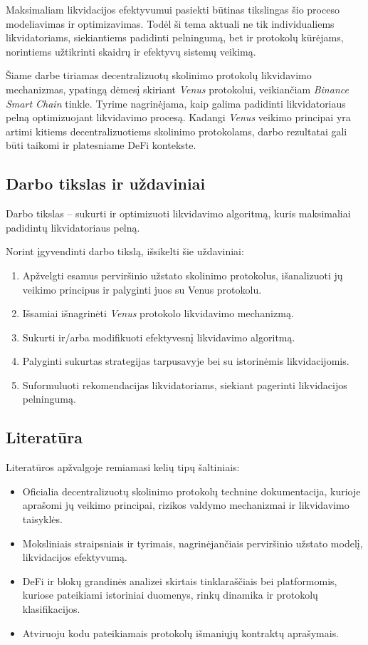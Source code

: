 \documentclass[]{VUMIFTemplateClass}
\begin{document}
Maksimaliam likvidacijos efektyvumui pasiekti būtinas tikslingas šio proceso modeliavimas ir optimizavimas. Todėl ši tema aktuali ne tik individualiems likvidatoriams, siekiantiems padidinti pelningumą, bet ir protokolų kūrėjams, norintiems užtikrinti skaidrų ir efektyvų sistemų veikimą.

Šiame darbe tiriamas decentralizuotų skolinimo protokolų likvidavimo mechanizmas, ypatingą dėmesį skiriant \textit{Venus} protokolui, veikiančiam \textit{Binance Smart Chain} tinkle. Tyrime nagrinėjama, kaip galima padidinti likvidatoriaus pelną optimizuojant likvidavimo procesą. Kadangi \textit{Venus} veikimo principai yra artimi kitiems decentralizuotiems skolinimo protokolams, darbo rezultatai gali būti taikomi ir platesniame DeFi kontekste.

\subsection*{Darbo tikslas ir uždaviniai}
Darbo tikslas – sukurti ir optimizuoti likvidavimo algoritmą, kuris maksimaliai padidintų likvidatoriaus pelną.

Norint įgyvendinti darbo tikslą, išsikelti šie uždaviniai:
\begin{enumerate}
    \item Apžvelgti esamus perviršinio užstato skolinimo protokolus, išanalizuoti jų veikimo principus ir palyginti juos su Venus protokolu.
    \item Išsamiai išnagrinėti \textit{Venus} protokolo likvidavimo mechanizmą.
    \item Sukurti ir/arba modifikuoti efektyvesnį likvidavimo algoritmą.
    \item Palyginti sukurtas strategijas tarpusavyje bei su istorinėmis likvidacijomis.
    \item Suformuluoti rekomendacijas likvidatoriams, siekiant pagerinti likvidacijos pelningumą.
\end{enumerate}

\subsection*{Literatūra}
Literatūros apžvalgoje remiamasi kelių tipų šaltiniais:
\begin{itemize}
\item Oficialia decentralizuotų skolinimo protokolų technine dokumentacija, kurioje aprašomi jų veikimo principai, rizikos valdymo mechanizmai ir likvidavimo taisyklės.
\item Moksliniais straipsniais ir tyrimais, nagrinėjančiais perviršinio užstato modelį, likvidacijos efektyvumą.
\item DeFi ir blokų grandinės analizei skirtais tinklaraščiais bei platformomis, kuriose pateikiami istoriniai duomenys, rinkų dinamika ir protokolų klasifikacijos.
\item Atviruoju kodu pateikiamais protokolų išmaniųjų kontraktų aprašymais.
\end{itemize}
\end{document}

